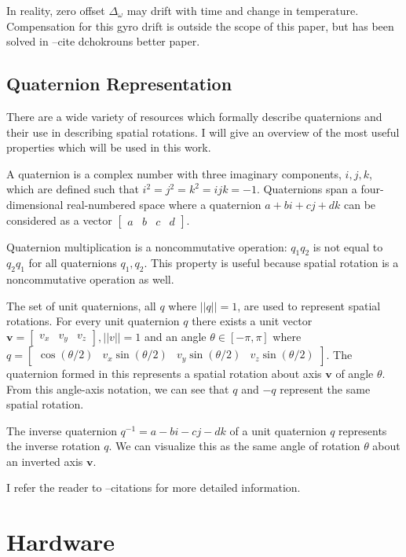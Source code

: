 \documentclass[12pt]{report}
\begin{document}
In reality, zero offset $\Delta_\omega$ may drift with time and change in temperature. Compensation for this gyro drift is outside the scope of this paper, but has been solved in --cite dchokrouns better paper.

\subsection{Quaternion Representation}

There are a wide variety of resources which formally describe quaternions and their use in describing spatial rotations. I will give an overview of the most useful properties which will be used in this work.

A quaternion is a complex number with three imaginary components, $i,j,k$, which are defined such that $i^2 = j^2 = k^2 = ijk = -1$. Quaternions span a four-dimensional real-numbered space where a quaternion $a + b i + c j + d k$ can be considered as a vector $\begin{bmatrix}a & b & c & d \end{bmatrix}$. 

Quaternion multiplication is a noncommutative operation: $q_1 q_2$ is not equal to $q_2 q_1$ for all quaternions $q_1, q_2$. This property is useful because spatial rotation is a noncommutative operation as well.

The set of unit quaternions, all $q$ where $ ||q|| = 1$, are used to represent spatial rotations. For every unit quaternion $q$ 
there exists a unit vector $\mathbf{v} = \begin{bmatrix} v_x & v_y & v_z \end{bmatrix}, ||v|| = 1$ 
and an angle $\theta \in [-\pi, \pi]$ where 
$q = \begin{bmatrix} \cos (\theta/2) & v_x \sin (\theta/2) & v_y \sin (\theta/2) & v_z \sin (\theta/2)\end{bmatrix}$. The quaternion formed in this represents a spatial rotation about axis $\mathbf{v}$ of angle $\theta$. 
From this angle-axis notation, we can see that $q$ and $-q$ represent the same spatial rotation. 

The inverse quaternion $q^{-1} = a - bi - cj - dk$ of a unit quaternion $q$ represents the inverse rotation $q$. We can visualize this as the same angle of rotation $\theta$ about an inverted axis $\mathbf{v}$.

I refer the reader to --citations for more detailed information.

\section{Hardware}
\end{document}
